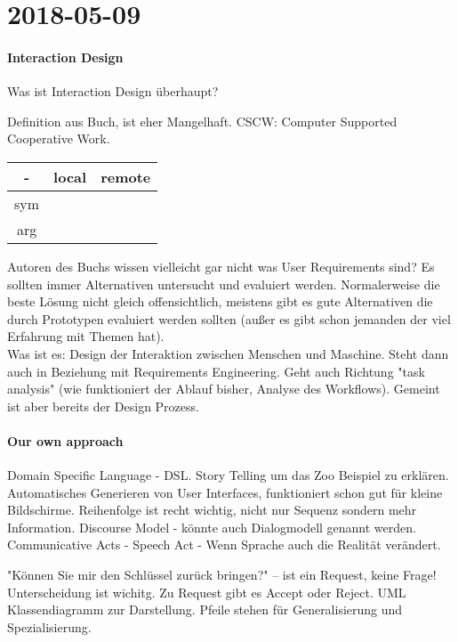 \section{2018-05-09}

\paragraph{Interaction Design}
Was ist Interaction Design überhaupt?

Definition aus Buch, ist eher Mangelhaft. CSCW: Computer Supported Cooperative Work.

\begin{center}
\begin{tabular}{ |c|c c| } 
 \hline
 - & local & remote \\ 
\hline
 sym &  &  \\ 
 arg &  &  \\ 
 \hline
\end{tabular}
\end{center}

Autoren des Buchs wissen vielleicht gar nicht was User Requirements sind?
Es sollten immer Alternativen untersucht und evaluiert werden. Normalerweise die
beste Lösung nicht gleich offensichtlich, meistens gibt es gute Alternativen die
durch Prototypen evaluiert werden sollten (außer es gibt schon jemanden der viel
Erfahrung mit Themen hat).
\\
Was ist es: Design der Interaktion zwischen Menschen und Maschine. Steht dann auch 
in Beziehung mit Requirements Engineering.
Geht auch Richtung "task analysis" (wie funktioniert der Ablauf bisher, Analyse des
Workflows). Gemeint ist aber bereits der Design Prozess. 
\\
\paragraph{Our own approach}

Domain Specific Language - DSL. Story Telling um das Zoo Beispiel zu erklären. 
Automatisches Generieren von User Interfaces, funktioniert schon gut für kleine
Bildschirme.
Reihenfolge ist recht wichtig, nicht nur Sequenz sondern mehr Information.
Discourse Model - könnte auch Dialogmodell genannt werden.
Communicative Acts - Speech Act - Wenn Sprache auch die Realität verändert.

"Können Sie mir den Schlüssel zurück bringen?" -- ist ein Request, keine Frage!
Unterscheidung ist wichitg. Zu Request gibt es Accept oder Reject.
UML Klassendiagramm zur Darstellung. Pfeile stehen für Generalisierung und
Spezialisierung. 

